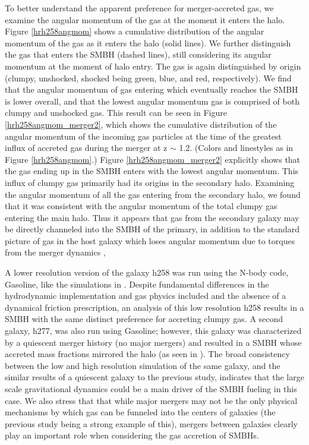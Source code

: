 \documentclass[]{emulateapj}
\begin{document}
To better understand the apparent preference for merger-accreted gas, we examine the angular momentum of the gas at the moment it enters the halo. Figure \ref{hrh258angmom} shows a cumulative distribution of the angular momentum of the gas as it enters the halo (solid lines). We further distinguish the gas that enters the SMBH (dashed lines), still considering its angular momentum at the moment of halo entry. The gas is again distinguished by origin (clumpy, unshocked, shocked being green, blue, and red, respectively). We find that the angular momentum of gas entering which eventually reaches the SMBH is lower overall, and that the lowest angular momentum gas is comprised of both clumpy and unshocked gas. This result can be seen in Figure \ref{hrh258angmom_merger2}, which shows the cumulative distribution of the angular momentum of the incoming gas particles at the time of the greatest influx of accreted gas during the merger at z $\sim$ 1.2. (Colors and linestyles as in Figure \ref{hrh258angmom}.) Figure \ref{hrh258angmom_merger2} explicitly shows that the gas ending up in the SMBH enters with the lowest angular momentum. This influx of clumpy gas primarily had its origins in the secondary halo. Examining the angular momentum of all the gas entering from the secondary halo, we found that it was consistent with the angular momentum of the total clumpy gas entering the main halo.  Thus it appears that gas from the secondary galaxy may be directly channeled into the SMBH of the primary, in addition to the standard picture of gas in the host galaxy which loses angular momentum due to torques from the merger dynamics \citep{Capelo2015}, 

A lower resolution version of the galaxy h258 was run using the N-body code, Gasoline, like the simulations in \cite{Bellovary2013}. Despite fundamental differences in the hydrodynamic implementation and gas physics included and the absence of a dynamical friction prescription, an analysis of this low resolution h258 results in a SMBH with the same distinct preference for accreting clumpy gas. A second galaxy, h277, was also run using Gasoline; however, this galaxy was characterized by a quiescent merger history (no major mergers) and resulted in a SMBH whose accreted mass fractions mirrored the halo (as seen in \cite{Bellovary2013}). The broad consistency between the low and high resolution simulation of the same galaxy, and the similar results of a quiescent galaxy to the previous study, indicates that the large scale gravitational dynamics could be a main driver of the SMBH fueling in this case. We also stress that that while major mergers may not be the only physical mechanisms by which gas can be funneled into the centers of galaxies (the previous study being a strong example of this), mergers between galaxies clearly play an important role when considering the gas accretion of SMBHs.
\end{document}
